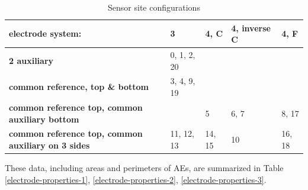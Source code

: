 \begin{table}
	\begin{tabular}{p{4cm}|p{2cm}|p{2cm}|p{2.5cm}|p{2cm}}
		electrode system: & \textbf{3} & \textbf{4, C} & \textbf{4, inverse C} & \textbf{4, F} \\
		\hline
		\textbf{2 auxiliary} & 0, 1, 2, 20 & & & \\
		\hline
		\textbf{common reference, top \& bottom} & 3, 4, 9, 19 & & & \\
		\hline
		\textbf{common reference top, common auxiliary bottom} & & 5 & 6, 7 & 8, 17 \\
		\hline
		\textbf{common reference top, common auxiliary on 3 sides} & 11, 12, 13 & 14, 15 & 10 & 16, 18
	\end{tabular}
	\caption{Sensor site configurations}
	\label{sensor-config}
\end{table}

These data, including areas and perimeters of AEs, are summarized in Table \ref{electrode-properties-1}, \ref{electrode-properties-2}, \ref{electrode-properties-3}.

